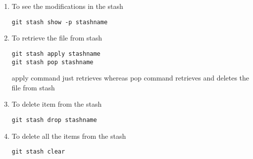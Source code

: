 \documentclass[paper=a4, fontsize=12pt]{scrartcl}
\begin{document}
\begin{enumerate}
\item To see the modifications in the stash
\begin{lstlisting}
git stash show -p stashname
\end{lstlisting}
\item To retrieve the file from stash
\begin{lstlisting}
git stash apply stashname
git stash pop stashname
\end{lstlisting}
apply command just retrieves whereas pop command retrieves and deletes the file from stash
\item To delete item from the stash
\begin{lstlisting}
git stash drop stashname
\end{lstlisting}
\item To delete all the items from the stash
\begin{lstlisting}
git stash clear
\end{lstlisting}
\end{enumerate}
\end{document}
